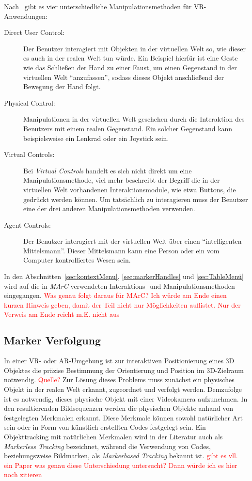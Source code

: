 Nach~\cite{sherman2002understanding} gibt es vier unterschiedliche Manipulationsmethoden für VR-An\-wen\-dung\-en:
\begin{description}
	\item[Direct User Control:] Der Benutzer interagiert mit Objekten in der virtuellen Welt so, wie dieser es auch in der realen Welt tun würde. Ein Beispiel hierfür ist eine Geste wie das Schließen der Hand zu einer Faust, um einen Gegenstand in der virtuellen Welt "`anzufassen"', sodass dieses Objekt anschließend der Bewegung der Hand folgt.
	\item[Physical Control:] Manipulationen in der virtuellen Welt geschehen durch die Interaktion des Benutzers mit einem realen Gegenstand. Ein solcher Gegenstand kann beispielsweise ein Lenkrad oder ein Joystick sein.
	\item[Virtual Controls:] Bei \emph{Virtual Controls} handelt es sich nicht direkt um eine Manipulationsmethode, viel mehr beschreibt der Begriff die in der virtuellen Welt vorhandenen Interaktionsmodule, wie etwa Buttons, die gedrückt werden können. Um tatsächlich zu interagieren muss der Benutzer eine der drei anderen Manipulationsmethoden verwenden.
	\item[Agent Controls:] Der Benutzer interagiert mit der virtuellen Welt über einen "`intelligenten Mittelsmann"'. Dieser Mittelsmann kann eine Person oder ein vom Computer kontrolliertes Wesen sein.
\end{description}
In den Abschnitten~\ref{sec:kontextMenu}, \ref{sec:markerHandles} und \ref{sec:TableMenü} wird auf die in \emph{MArC} verwendeten Interaktions- und Manipulationsmethoden eingegangen.
 \textcolor{red}{Was genau folgt daraus für MArC? Ich würde am Ende einen kurzen Hinweis geben, damit der Teil nicht nur Möglichkeiten auflistet. Nur der Verweis am Ende reicht m.E. nicht aus}
\subsection{Marker Verfolgung} \label{sec:MarkerTracking}
In einer VR- oder AR-Umgebung ist zur interaktiven Positionierung eines 3D Objektes die präzise Bestimmung der Orientierung und Position im 3D-Zielraum notwendig. \textcolor{red}{Quelle?} Zur Lösung dieses Problems muss zunächst ein physisches Objekt in der realen Welt erkannt, zugeordnet und verfolgt werden. Demzufolge ist es notwendig, dieses physische Objekt mit einer Videokamera aufzunehmen. In den resultierenden Bildsequenzen werden die physischen Objekte anhand von festgelegten Merkmalen erkannt. Diese Merkmale können sowohl natürlicher Art sein oder in Form von künstlich erstellten Codes festgelegt sein. Ein Objekttracking mit natürlichen Merkmalen wird in der Literatur auch als \textit{Markerless Tracking} bezeichnet, während die Verwendung von Codes, beziehungsweise Bildmarken, als \textit{Markerbased Tracking} bekannt ist. \textcolor{red}{gibt es vll. ein Paper was genau diese Unterschiedung untersucht? Dann würde ich es hier noch zitieren}

